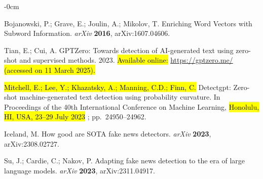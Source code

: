 \documentclass[electronics,article,accept,pdftex,moreauthors,electronics]{Definitions/mdpi}
\begin{document}
\begin{adjustwidth}{-\extralength}{0cm}
\begin{thebibliography}{999}
Bojanowski, P.; Grave, E.; Joulin, A.; Mikolov, T.
\newblock Enriching Word Vectors with Subword Information.
\newblock \emph{arXiv} {\bf 2016}, arXiv:1607.04606.

Tian, E.; Cui, A.
\newblock GPTZero: Towards detection of AI-generated text using zero-shot and supervised methods. 2023. \hl{Available online:} %
 \url{https://gptzero.me/} \hl{(accessed on 11 March 2025). } %



\hl{Mitchell, E.; Lee, Y.; Khazatsky, A.; Manning, C.D.; Finn, C.} %
\newblock Detectgpt: Zero-shot machine-generated text detection using
  probability curvature.
\newblock In Proceedings of the 40th {International} {Conference} on {Machine} {Learning},  \hl{Honolulu, HI, USA, 23--29 July 2023}%
; pp.~24950--24962.

Iceland, M.
\newblock How good are SOTA fake news detectors.
\newblock \emph{arXiv} {\bf 2023}, arXiv:2308.02727.

Su, J.; Cardie, C.; Nakov, P.
\newblock Adapting fake news detection to the era of large language models.
\newblock \emph{arXiv} {\bf 2023}, arXiv:2311.04917.

\end{thebibliography}


\PublishersNote{}
\end{adjustwidth}
\end{document}

